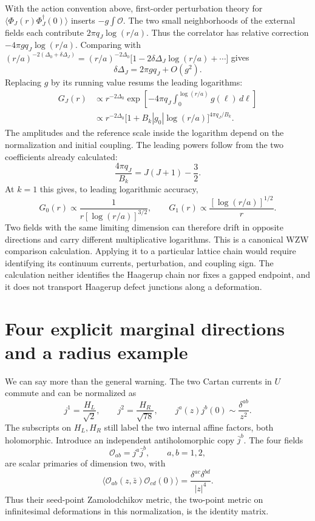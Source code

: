 \begin{example}
With the action convention above, first-order perturbation theory
for $\langle\Phi_J(r)\Phi_J^\dagger(0)\rangle$ inserts
$-g\int\mathcal O$. The two small neighborhoods of the external
fields each contribute $2\pi q_J\log(r/a)$. Thus the correlator
has relative correction $-4\pi gq_J\log(r/a)$.
Comparing with
$(r/a)^{-2(\Delta_0+\delta\Delta_J)}
=(r/a)^{-2\Delta_0}
 \bigl[1-2\delta\Delta_J\log(r/a)+\cdots\bigr]$
gives
\[
 \delta\Delta_J=2\pi gq_J+O(g^2).
\]
Replacing $g$ by its running value resums the leading logarithms:
\begin{align*}
 G_J(r)&\propto r^{-2\Delta_0}
  \exp\!\left[-4\pi q_J
         \int_0^{\log(r/a)}g(\ell)\,d\ell\right]\\
 &\propto r^{-2\Delta_0}
     \bigl[1+B_k|g_0|\log(r/a)\bigr]^{4\pi q_J/B_k}.
\end{align*}
The amplitudes and the reference scale inside the logarithm
depend on the normalization and initial coupling. The leading
powers follow from the two coefficients already calculated:
\[
 \frac{4\pi q_J}{B_k}=J(J+1)-\frac32.
\]
At $k=1$ this gives, to leading logarithmic accuracy,
\[
 G_0(r)\propto\frac1{r[\log(r/a)]^{3/2}},
 \qquad
 G_1(r)\propto\frac{[\log(r/a)]^{1/2}}{r}.
\]
Two fields with the same limiting dimension can therefore drift
in opposite directions and carry different multiplicative
logarithms. This is a canonical WZW comparison calculation.
Applying it to a particular lattice chain would require identifying
its continuum currents, perturbation, and coupling sign. The
calculation neither identifies the Haagerup chain nor fixes a
gapped endpoint, and it does not transport Haagerup defect
junctions along a deformation.
\end{example}

\section{Four explicit marginal directions and a radius example}

We can say more than the general warning. The two Cartan currents
in $U$ commute and can be normalized as
\[
 j^1=\frac{H_L}{\sqrt2},\qquad
 j^2=\frac{H_R}{\sqrt{78}},\qquad
 j^a(z)j^b(0)\sim\frac{\delta^{ab}}{z^2}.
\]
The subscripts on $H_L,H_R$ still label the two internal
affine factors, both holomorphic. Introduce an independent
antiholomorphic copy $\bar j^b$. The four fields
\begin{equation}
 \mathcal O_{ab}=j^a\bar j^b,\qquad a,b=1,2,
 \label{eq:full-abelian-marginals}
\end{equation}
are scalar primaries of dimension two, with
\[
 \langle\mathcal O_{ab}(z,\bar z)\mathcal O_{cd}(0)\rangle
 =\frac{\delta^{ac}\delta^{bd}}{|z|^4}.
\]
Thus their seed-point Zamolodchikov metric, the two-point metric
on infinitesimal deformations in this normalization, is the
identity matrix.

